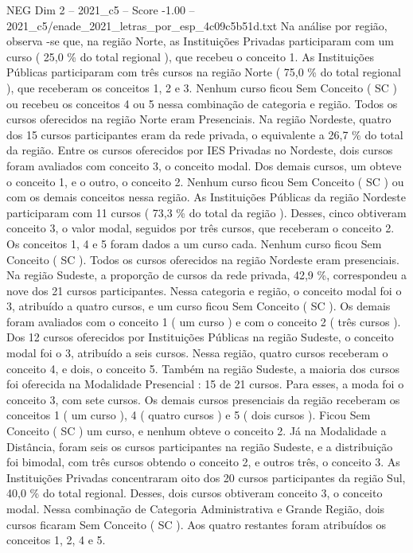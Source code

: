 \begin{textsample}{NEG Dim 2 – 2021\_c5 – Score -1.00 – 2021\_c5/enade\_2021\_letras\_por\_esp\_4c09c5b51d.txt}
Na análise por região, observa -se que, na região Norte, as Instituições Privadas participaram com um curso ( 25,0 \% do total regional ), que recebeu o conceito 1.
As Instituições Públicas participaram com três cursos na região Norte ( 75,0 \% do total regional ), que receberam os conceitos 1, 2 e 3.
Nenhum curso ficou Sem Conceito ( SC ) ou recebeu os conceitos 4 ou 5 nessa combinação de categoria e região.
Todos os cursos oferecidos na região Norte eram Presenciais.
Na região Nordeste, quatro dos 15 cursos participantes eram da rede privada, o equivalente a 26,7 \% do total da região.
Entre os cursos oferecidos por IES Privadas no Nordeste, dois cursos foram avaliados com conceito 3, o conceito modal.
Dos demais cursos, um obteve o conceito 1, e o outro, o conceito 2.
Nenhum curso ficou Sem Conceito ( SC ) ou com os demais conceitos nessa região.
As Instituições Públicas da região Nordeste participaram com 11 cursos ( 73,3 \% do total da região ).
Desses, cinco obtiveram conceito 3, o valor modal, seguidos por três cursos, que receberam o conceito 2.
Os conceitos 1, 4 e 5 foram dados a um curso cada.
Nenhum curso ficou Sem Conceito ( SC ).
Todos os cursos oferecidos na região Nordeste eram presenciais.
Na região Sudeste, a proporção de cursos da rede privada, 42,9 \%, correspondeu a nove dos 21 cursos participantes.
Nessa categoria e região, o conceito modal foi o 3, atribuído a quatro cursos, e um curso ficou Sem Conceito ( SC ).
Os demais foram avaliados com o conceito 1 ( um curso ) e com o conceito 2 ( três cursos ).
Dos 12 cursos oferecidos por Instituições Públicas na região Sudeste, o conceito modal foi o 3, atribuído a seis cursos.
Nessa região, quatro cursos receberam o conceito 4, e dois, o conceito 5.
Também na região Sudeste, a maioria dos cursos foi oferecida na Modalidade Presencial : 15 de 21 cursos.
Para esses, a moda foi o conceito 3, com sete cursos.
Os demais cursos presenciais da região receberam os conceitos 1 ( um curso ), 4 ( quatro cursos ) e 5 ( dois cursos ).
Ficou Sem Conceito ( SC ) um curso, e nenhum obteve o conceito 2.
Já na Modalidade a Distância, foram seis os cursos participantes na região Sudeste, e a distribuição foi bimodal, com três cursos obtendo o conceito 2, e outros três, o conceito 3.
As Instituições Privadas concentraram oito dos 20 cursos participantes da região Sul, 40,0 \% do total regional.
Desses, dois cursos obtiveram conceito 3, o conceito modal.
Nessa combinação de Categoria Administrativa e Grande Região, dois cursos ficaram Sem Conceito ( SC ).
Aos quatro restantes foram atribuídos os conceitos 1, 2, 4 e 5.

\end{textsample}
